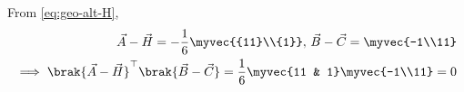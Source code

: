 \solution
From 
		\eqref{eq:geo-alt-H},
\begin{align}
\vec{A}-\vec{H}=-\frac{1}{6}\myvec{{11}\\{1}},\,
\vec{B}-\vec{C}=\myvec{-1\\11}
\\
	\implies \brak{\vec{A}-\vec{H}}^{\top}\brak{\vec{B}-\vec{C}}=\frac{1}{6}\myvec{11 & 1}
\myvec{-1\\11}
=0
\end{align}

